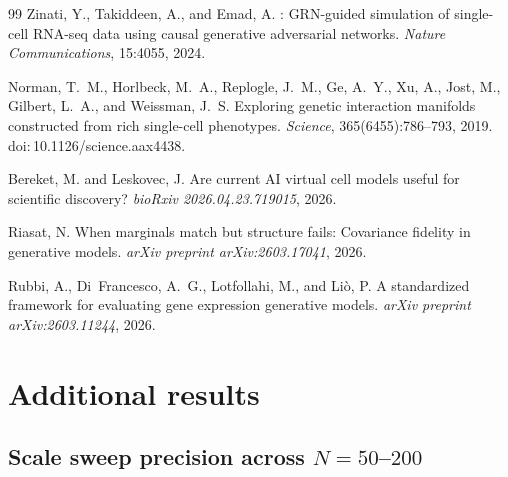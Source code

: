 \documentclass{article}
\theoremstyle{plain}
\theoremstyle{definition}
\theoremstyle{remark}
\begin{document}
\begin{thebibliography}{99}
Zinati, Y., Takiddeen, A., and Emad, A.
: {GRN}-guided simulation of single-cell {RNA}-seq data using causal generative adversarial networks.
\newblock \emph{Nature Communications}, 15:4055, 2024.

Norman, T.~M., Horlbeck, M.~A., Replogle, J.~M., Ge, A.~Y., Xu, A., Jost, M., Gilbert, L.~A., and Weissman, J.~S.
\newblock Exploring genetic interaction manifolds constructed from rich single-cell phenotypes.
\newblock \emph{Science}, 365(6455):786--793, 2019. doi:\,10.1126/science.aax4438.

Bereket, M. and Leskovec, J.
\newblock Are current {AI} virtual cell models useful for scientific discovery?
\newblock \emph{bioRxiv 2026.04.23.719015}, 2026.

Riasat, N.
\newblock When marginals match but structure fails: Covariance fidelity in generative models.
\newblock \emph{arXiv preprint arXiv:2603.17041}, 2026.

Rubbi, A., Di~Francesco, A.~G., Lotfollahi, M., and Li{\`o}, P.
\newblock A standardized framework for evaluating gene expression generative models.
\newblock \emph{arXiv preprint arXiv:2603.11244}, 2026.

\end{thebibliography}

\newpage
\appendix
\onecolumn

\section{Additional results}

\subsection{Scale sweep precision across $N{=}50$--$200$}
\end{document}
